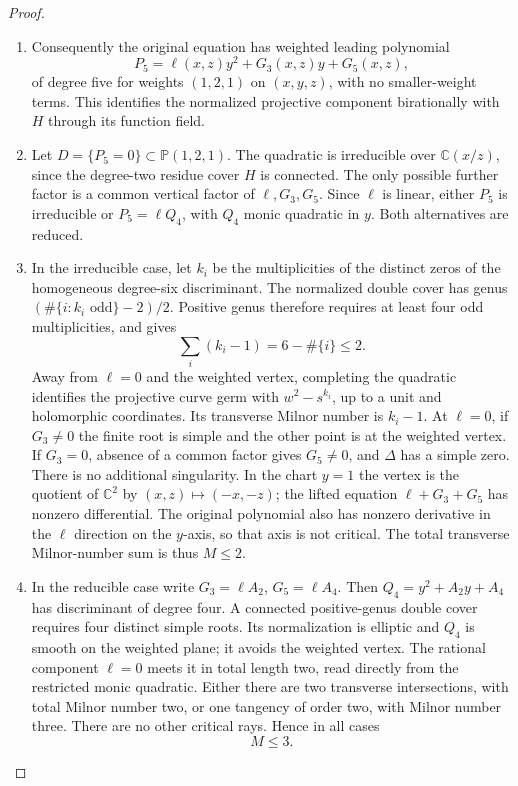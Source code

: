\begin{proof}
\begin{enumerate}[label={$\langle1\rangle$\arabic*.},leftmargin=*]
\item Consequently the original equation has weighted
leading polynomial
\[
          P_5=\ell(x,z)y^2+G_3(x,z)y+G_5(x,z),               \tag{4.53b}
\]
of degree five for weights $(1,2,1)$ on $(x,y,z)$,
with no smaller-weight terms. This identifies the
normalized projective component birationally with
$H$ through its function field.

\item Let $D=\{P_5=0\}\subset\mathbb P(1,2,1)$.
The quadratic is irreducible over $\mathbb C(x/z)$,
since the degree-two residue cover $H$ is connected.
The only possible further factor is a common
vertical factor of $\ell,G_3,G_5$. Since $\ell$
is linear, either $P_5$ is irreducible or
$P_5=\ell Q_4$, with $Q_4$ monic quadratic in $y$.
Both alternatives are reduced.

\item In the irreducible case, let $k_i$ be the
multiplicities of the distinct zeros of the
homogeneous degree-six discriminant. The normalized
double cover has genus
$(\#\{i:k_i\text{ odd}\}-2)/2$. Positive genus
therefore requires at least four odd multiplicities,
and gives
\[
              \sum_i(k_i-1)=6-\#\{i\}\le2.                  \tag{4.53c}
\]
Away from $\ell=0$ and the weighted vertex,
completing the quadratic identifies the projective
curve germ with $w^2-s^{k_i}$, up to a unit and
holomorphic coordinates. Its transverse Milnor
number is $k_i-1$. At $\ell=0$, if $G_3\ne0$ the
finite root is simple and the other point is at
the weighted vertex. If $G_3=0$, absence of a
common factor gives $G_5\ne0$, and $\Delta$ has
a simple zero. There is no additional singularity.
In the chart $y=1$ the vertex is the quotient of
$\mathbb C^2$ by $(x,z)\mapsto(-x,-z)$; the
lifted equation $\ell+G_3+G_5$ has nonzero
differential. The original polynomial also has
nonzero derivative in the $\ell$ direction on
the $y$-axis, so that axis is not critical.
The total transverse Milnor-number sum is thus
$M\le2$.

\item In the reducible case write
$G_3=\ell A_2$, $G_5=\ell A_4$. Then
$Q_4=y^2+A_2y+A_4$ has discriminant of degree four.
A connected positive-genus double cover requires
four distinct simple roots. Its normalization is
elliptic and $Q_4$ is smooth on the weighted plane;
it avoids the weighted vertex. The rational
component $\ell=0$ meets it in total length two,
read directly from the restricted monic quadratic.
Either there are two transverse intersections,
with total Milnor number two, or one tangency of
order two, with Milnor number three. There are no
other critical rays. Hence in all cases
\[
                              M\le3.                       \tag{4.53d}
\]


\end{enumerate}
\end{proof}
